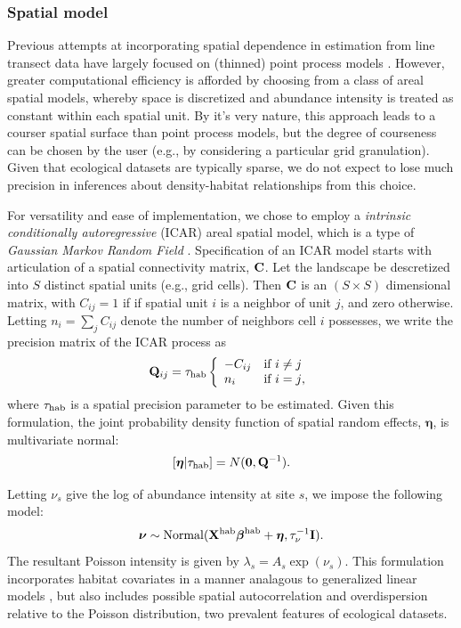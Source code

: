\documentclass[10pt]{article}
\newcommand{\bn}{\ensuremath{\boldsymbol{\eta}}}
\newcommand{\bQ}{\ensuremath{\mathbf{Q}}}
\begin{document}
\subsubsection*{Spatial model}

Previous attempts at incorporating spatial dependence in estimation from line transect data have largely focused on (thinned) point process models \cite{HedleyBuckland2004,JohnsonEtAl2010}.  However, greater computational efficiency is afforded by choosing from a class of areal spatial models, whereby space is discretized and abundance intensity is treated as constant within each spatial unit.  By it's very nature, this approach leads to a courser spatial surface than point process models, but the degree of courseness can be chosen by the user (e.g., by considering a particular grid granulation).  Given that ecological datasets are typically sparse, we do not expect to lose much precision in inferences about density-habitat relationships from this choice.

For versatility and ease of implementation, we chose to employ a \emph{intrinsic conditionally autoregressive} (ICAR) areal spatial model, which is a type of \emph{Gaussian Markov Random Field} \cite{BesagEtAl1991,BesagKooperberg1995,RueHeld2005}.   Specification of an ICAR model starts with articulation of a spatial connectivity matrix, ${\bf C}$.  Let the landscape be descretized into $S$ distinct spatial units (e.g., grid cells).  Then ${\bf C}$ is an $(S \times S)$ dimensional matrix, with $C_{ij}=1$ if if spatial unit $i$ is a neighbor of unit $j$, and zero otherwise.  Letting $n_i=\sum_j C_{ij}$ denote the number of neighbors cell $i$ possesses,
we write the precision matrix of the ICAR process as
$$
\bQ_{ij} = \tau_{\rm hab}\left\{\begin{array}{ll}
				-C_{ij} & \mbox{if $i\ne j$}\\
				n_i & \mbox{if $i=j$,}
				\end{array}\right.
$$
where $\tau_{\rm hab}$ is a spatial precision parameter to be estimated.
Given this formulation, the joint probability density function of spatial random effects, $\bn$, is multivariate normal:
$$
[\bn|\tau_{\rm hab}] = N(\mathbf{0},\bQ^{-1}).
$$

Letting $\nu_s$ give the log of abundance intensity at site $s$, we impose the following model:
$$
 \boldsymbol{\nu} \sim {\rm Normal}({\bf X}^{\rm hab}
 \boldsymbol{\beta}^{\rm hab}+\boldsymbol{\eta},\tau_\nu^{-1}{\bf I}).
$$
The resultant Poisson intensity is given by $\lambda_s=A_s \exp(\nu_s)$.  This formulation incorporates habitat covariates in a manner analagous to generalized linear models \cite{McCullaghNelder1989}, but also includes possible spatial autocorrelation and overdispersion relative to the Poisson distribution, two prevalent features of ecological datasets.
\end{document}
